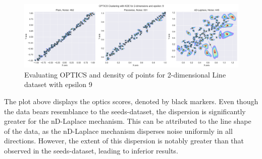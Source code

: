 \begin{figure}[H]
  \centering
  \includegraphics[width=1\linewidth]{Discussion/behaviour-2d-line-dataset&optics.png}
  \caption{Evaluating OPTICS and density of points for 2-dimensional Line dataset with epsilon 9}
  \label{fig:validation-Line-dataset_comparison_2d-laplace}
\end{figure}

The plot above displays the \gls{optics} scores, denoted by black markers. Even though the data bears resemblance to the seeds-dataset, the dispersion is significantly greater for the nD-Laplace mechanism. This can be attributed to the line shape of the data, as the nD-Laplace mechanism disperses noise uniformly in all directions. However, the extent of this dispersion is notably greater than that observed in the seeds-dataset, leading to inferior results.

